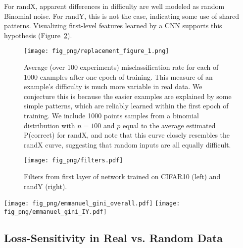 \documentclass{article}
\begin{document}
For randX, apparent differences in difficulty are well modeled as random Binomial noise.
For randY, this is not the case, indicating some use of shared patterns. 
Visualizing first-level features learned by a CNN supports this hypothesis (Figure~\ref{fig:filters.pdf}).

\begin{figure}[!t]
  \center
  \label{fig:easy_hard.pdf}
  \texttt{[image: fig\_png/replacement\_figure\_1.png]}
  \caption{Average (over 100 experiments) misclassification rate for each of 1000 examples after one epoch of training.
           This measure of an example's difficulty is much more variable in real data.
       We conjecture this is because the easier examples are explained by some simple patterns, which are reliably learned within the first epoch of training.
	   We include 1000 points samples from a binomial distribution with $n=100$ and $p$ equal to the average estimated P(correct) for randX, and note that this curve closely resembles the randX curve, suggesting that random inputs are all equally difficult.
}
\end{figure}

\begin{figure}[!t]
  \center
  \label{fig:filters.pdf}
  \texttt{[image: fig\_png/filters.pdf]}
  \caption{Filters from first layer of network trained on CIFAR10 (left) and randY (right).}
\end{figure}

\begin{figure*}[!ht]
  \centering
  \texttt{[image: fig\_png/emmanuel\_gini\_overall.pdf]}
  \hspace{-1em}
  \texttt{[image: fig\_png/emmanuel\_gini\_IY.pdf]}
  \caption{Plots of the Gini coefficient of $\bar{g}_\mathbf{x}$ over examples $\mathbf{x}$ (see section \ref{sec:grad_sens}) as training progresses, for a 1000-example real dataset (14x14 MNIST) versus random data. On the left, $Y$ is the normal class label; on the right, there are as many classes as examples, the network has to learn to map each example to a unique class.
    }
  \label{fig:grad_sensitivity}
\end{figure*}
        


\subsection{Loss-Sensitivity in Real vs. Random Data}
\label{sec:grad_sens}
\end{document}
